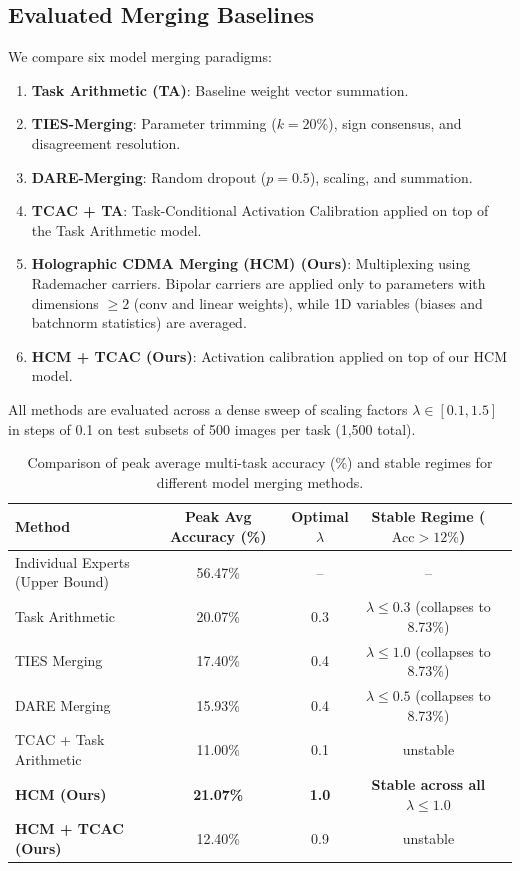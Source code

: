 \documentclass{article}
\begin{document}
\subsection{Evaluated Merging Baselines}
We compare six model merging paradigms:
\begin{enumerate}
    \item \textbf{Task Arithmetic (TA)}: Baseline weight vector summation.
    \item \textbf{TIES-Merging}: Parameter trimming ($k=20\%$), sign consensus, and disagreement resolution.
    \item \textbf{DARE-Merging}: Random dropout ($p=0.5$), scaling, and summation.
    \item \textbf{TCAC + TA}: Task-Conditional Activation Calibration \cite{jordan22_repair} applied on top of the Task Arithmetic model.
    \item \textbf{Holographic CDMA Merging (HCM) (Ours)}: Multiplexing using Rademacher carriers. Bipolar carriers are applied only to parameters with dimensions $\ge 2$ (conv and linear weights), while 1D variables (biases and batchnorm statistics) are averaged.
    \item \textbf{HCM + TCAC (Ours)}: Activation calibration applied on top of our HCM model.
\end{enumerate}
All methods are evaluated across a dense sweep of scaling factors $\lambda \in [0.1, 1.5]$ in steps of 0.1 on test subsets of 500 images per task (1,500 total).

\begin{table}[t]
\caption{Comparison of peak average multi-task accuracy (\%) and stable regimes for different model merging methods.}
\label{tab:results}
\vskip 0.15in
\begin{center}
\begin{small}
\begin{sc}
\begin{tabular}{lcccc}
\toprule
Method & Peak Avg Accuracy (\%) & Optimal $\lambda$ & Stable Regime ($\text{Acc} > 12\%$) \\
\midrule
Individual Experts (Upper Bound) & 56.47\% & -- & -- \\
Task Arithmetic & 20.07\% & 0.3 & $\lambda \le 0.3$ (collapses to 8.73\%) \\
TIES Merging & 17.40\% & 0.4 & $\lambda \le 1.0$ (collapses to 8.73\%) \\
DARE Merging & 15.93\% & 0.4 & $\lambda \le 0.5$ (collapses to 8.73\%) \\
TCAC + Task Arithmetic & 11.00\% & 0.1 & unstable \\
\textbf{HCM (Ours)} & \textbf{21.07\%} & \textbf{1.0} & \textbf{Stable across all $\lambda \le 1.0$} \\
\textbf{HCM + TCAC (Ours)} & 12.40\% & 0.9 & unstable \\
\bottomrule
\end{tabular}
\end{sc}
\end{small}
\end{center}
\vskip -0.1in
\end{table}
\end{document}
